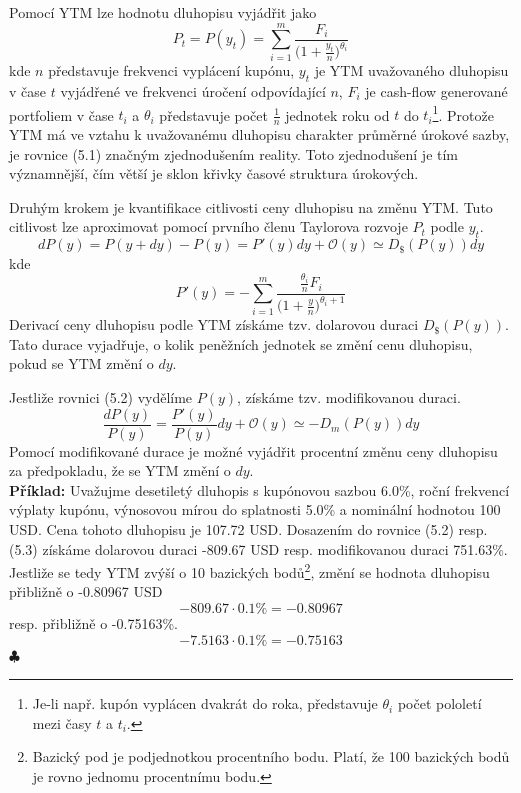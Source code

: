 \documentclass[a4paper]{book}
\begin{document}
Pomocí YTM lze hodnotu dluhopisu vyjádřit jako
\begin{equation}
P_t = P(y_t) = \sum_{i=1}^m \frac{F_i}{\Big(1+\frac{y_t}{n}\Big)^{\theta_i}}
\end{equation}
kde $n$ představuje frekvenci vyplácení kupónu, $y_t$ je YTM uvažovaného dluhopisu v čase $t$ vyjádřené ve frekvenci úročení odpovídající $n$, $F_i$ je cash-flow generované portfoliem v čase $t_i$ a $\theta_i$ představuje počet $\frac{1}{n}$ jednotek roku od $t$ do $t_i$\footnote{Je-li např. kupón vyplácen dvakrát do roka, představuje $\theta_i$ počet pololetí mezi časy $t$ a $t_i$.}. Protože YTM má ve vztahu k uvažovanému dluhopisu charakter průměrné úrokové sazby, je rovnice (5.1) značným zjednodušením reality. Toto zjednodušení je tím významnější, čím větší je sklon křivky časové struktura úrokových.

Druhým krokem je kvantifikace citlivosti ceny dluhopisu na změnu YTM. Tuto citlivost lze aproximovat pomocí prvního členu Taylorova rozvoje $P_t$ podle $y_t$.
\begin{equation}
d P(y) = P(y + dy) - P(y) = P'(y)dy + \mathcal{O}(y) \simeq D_\$(P(y))dy
\end{equation}
kde
\begin{equation*}
P'(y) = - \sum_{i=1}^m \frac{\frac{\theta_i}{n}F_i}{\Big( 1 + \frac{y}{n}\Big)^{\theta_i + 1}}
\end{equation*}
Derivací ceny dluhopisu podle YTM získáme tzv. dolarovou duraci $D_{\$}(P(y))$. Tato durace vyjadřuje, o kolik peněžních jednotek se změní cenu dluhopisu, pokud se YTM změní o $dy$.

Jestliže rovnici (5.2) vydělíme $P(y)$, získáme tzv. modifikovanou duraci.
\begin{equation}
\frac{dP(y)}{P(y)} = \frac{P'(y)}{P(y)}dy + \mathcal{O}(y) \simeq -D_m(P(y))dy
\end{equation}
Pomocí modifikované durace je možné vyjádřit procentní změnu ceny dluhopisu za předpokladu, že se YTM změní o $dy$.\\

\noindent \textbf{Příklad:} Uvažujme desetiletý dluhopis s kupónovou sazbou 6.0\%, roční frekvencí výplaty kupónu, výnosovou mírou do splatnosti 5.0\% a nominální hodnotou 100 USD. Cena tohoto dluhopisu je 107.72 USD. Dosazením do rovnice (5.2) resp. (5.3) získáme dolarovou duraci -809.67 USD resp. modifikovanou duraci 751.63\%. Jestliže se tedy YTM zvýší o 10 bazických bodů\footnote{Bazický pod je podjednotkou procentního bodu. Platí, že 100 bazických bodů je rovno jednomu procentnímu bodu.}, změní se hodnota dluhopisu přibližně o -0.80967 USD
\begin{equation*}
-809.67 \cdot 0.1\% = -0.80967
\end{equation*}
resp. přibližně o -0.75163\%.
\begin{equation*}
-7.5163 \cdot 0.1\% = -0.75163
\end{equation*}
$\clubsuit$
\end{document}
